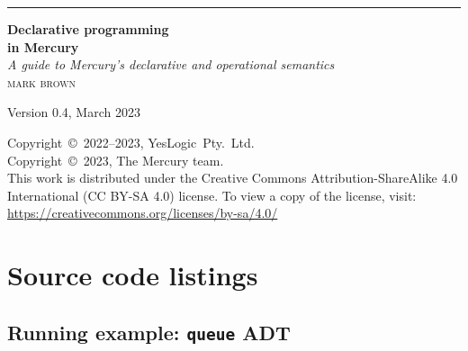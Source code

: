\documentclass[a4paper,11pt]{book}
\begin{document}
\frontmatter

\begin{titlepage}
\raggedleft
\rule{1pt}{\textheight}
\hspace{0.05\textwidth}
\parbox[b]{0.8\textwidth}{
{\Huge\bfseries Declarative programming \\[0.5\baselineskip] in Mercury}
\\[2\baselineskip]
{\large\textit{A guide to Mercury's declarative and operational semantics}}
\\[4\baselineskip]
{\Large\textsc{mark brown}} %

\vspace{0.5\textheight} %

{Version 0.4, March 2023}
}
\end{titlepage}

\vspace*{\fill}

\noindent
Copyright~\copyright~2022--2023, YesLogic~Pty.~Ltd.\\
Copyright~\copyright~2023, The Mercury team. \\[0.5\baselineskip]
This work is distributed under the Creative Commons
Attribution-ShareAlike 4.0 International (CC BY-SA 4.0) license.
To view a copy of the license, visit:\\
\href{https://creativecommons.org/licenses/by-sa/4.0/}{https://creativecommons.org/licenses/by-sa/4.0/}

\tableofcontents



\mainmatter









\appendix



\chapter{Source code listings}
\label{sec:listings}

\section{Running example: \texttt{queue} ADT}
\label{sec:listing-queue}

\end{document}
